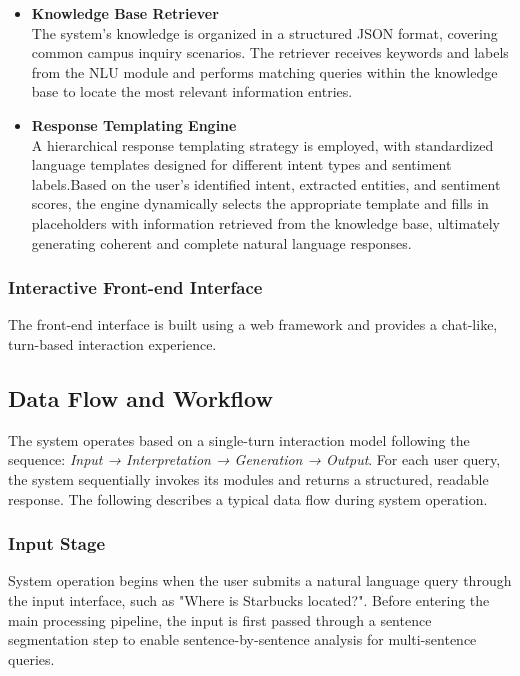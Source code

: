 \documentclass{xum_review}
\begin{document}
	\begin{itemize}
		\item{\textbf{Knowledge Base Retriever}}\\
		The system's knowledge is organized in a structured JSON format,
		covering common campus inquiry scenarios. The retriever receives
		keywords and labels from the NLU module and performs matching queries
		within the knowledge base to locate the most relevant information
		entries.
		\item{\textbf{Response Templating Engine}}\\
		A hierarchical response templating strategy is employed, with
		standardized language templates designed for different intent types and
		sentiment labels.Based on the user's identified intent, extracted
		entities, and sentiment scores, the engine dynamically selects the
		appropriate template and fills in placeholders with information
		retrieved from the knowledge base, ultimately generating coherent and
		complete natural language responses.
	\end{itemize}

	\subsubsection{Interactive Front-end Interface}

	The front-end interface is built using a web framework and provides a
	chat-like, turn-based interaction experience.

	\subsection{Data Flow and Workflow}

	The system operates based on a single-turn interaction model following the
	sequence: \textit{Input → Interpretation → Generation → Output}. For each
	user query, the system sequentially invokes its modules and returns a
	structured, readable response. The following describes a typical data flow
	during system operation.


	\subsubsection{Input Stage}

	System operation begins when the user submits a natural language query
	through the input interface, such as "Where is Starbucks located?".
	Before entering the main processing pipeline, the input is first passed
	through a sentence segmentation step to enable sentence-by-sentence analysis
	for multi-sentence queries.
\end{document}
